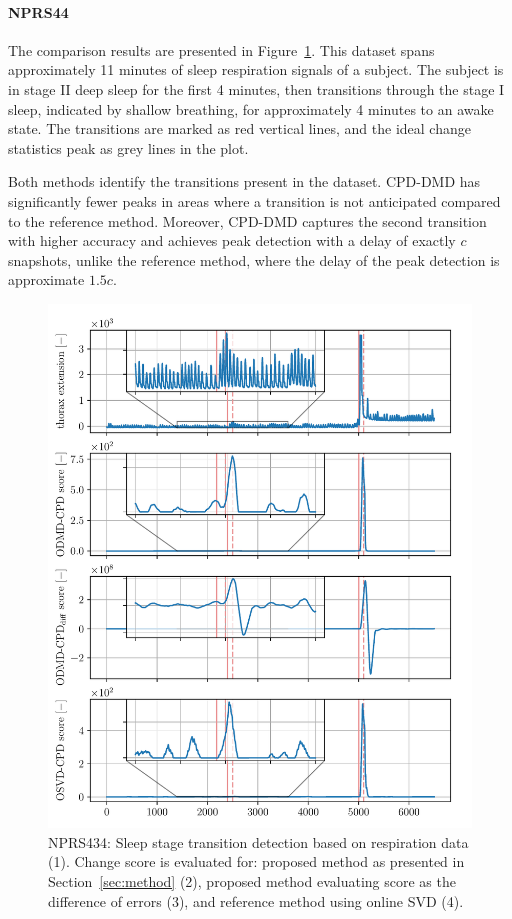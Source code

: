 \paragraph{NPRS44}
The comparison results are presented in Figure~\ref{fig:nprs44}. This dataset spans approximately 11 minutes of sleep respiration signals of a subject. The subject is in stage II deep sleep for the first 4 minutes, then transitions through the stage I sleep, indicated by shallow breathing, for approximately 4 minutes to an awake state. The transitions are marked as red vertical lines, and the ideal change statistics peak as grey lines in the plot.

Both methods identify the transitions present in the dataset. CPD-DMD has significantly fewer peaks in areas where a transition is not anticipated compared to the reference method. Moreover, CPD-DMD captures the second transition with higher accuracy and achieves peak detection with a delay of exactly \(c\) snapshots, unlike the reference method, where the delay of the peak detection is approximate \(1.5c\).

\begin{figure}
    \centering
    \includegraphics[width=\linewidth]{figures/nprs44-chd_r2-roll_301-dmd_w1.0-h80.pdf}
    \caption{NPRS434: Sleep stage transition detection based on respiration data (1). Change score is evaluated for: proposed method as presented in Section~\ref{sec:method} (2), proposed method evaluating score as the difference of errors (3), and reference method using online SVD (4).}\label{fig:nprs44}
\end{figure}

